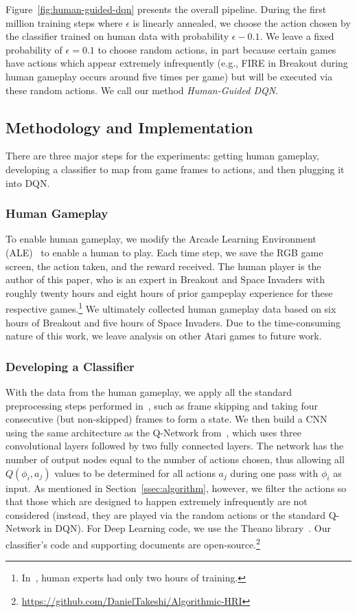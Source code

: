 \documentclass[letterpaper, 10pt, conference]{ieeeconf}
\begin{document}
Figure~\ref{fig:human-guided-dqn} presents the overall pipeline.  During the
first million training steps where $\epsilon$ is linearly annealed, we choose
the action chosen by the classifier trained on human data with probability
$\epsilon-0.1$. We leave a fixed probability of $\epsilon=0.1$ to choose random
actions, in part because certain games have actions which appear extremely
infrequently (e.g., FIRE in Breakout during human gameplay occurs around five
times per game) but will be executed via these random actions. We call our
method \emph{Human-Guided DQN}.

\subsection{Methodology and Implementation}\label{ssec:implementation}

There are three major steps for the experiments: getting human gameplay,
developing a classifier to map from game frames to actions, and then plugging it
into DQN. 

\subsubsection{Human Gameplay} To enable human gameplay, we modify the Arcade
Learning Environment (ALE)~\cite{bellemare13arcade} to enable a human to play.
Each time step, we save the RGB game screen, the action taken, and the reward
received. The human player is the author of this paper, who is an expert in
Breakout and Space Invaders with roughly twenty hours and eight hours of prior
gampeplay experience for these respective
games.\footnote{In~\cite{mnih-dqn-2015}, human experts had only two hours of
training.} We ultimately collected human gameplay data based on six hours of
Breakout and five hours of Space Invaders. Due to the time-consuming nature of
this work, we leave analysis on other Atari games to future work.

\subsubsection{Developing a Classifier} With the data from the human gameplay,
we apply all the standard preprocessing steps performed in~\cite{mnih-dqn-2015},
such as frame skipping and taking four consecutive (but non-skipped) frames to
form a state. We then build a CNN using the same architecture as the Q-Network
from~\cite{mnih-dqn-2015}, which uses three convolutional layers followed by two
fully connected layers. The network has the number of output nodes equal to the
number of actions chosen, thus allowing all $Q(\phi_i,a_j)$ values to be
determined for all actions $a_j$ during one pass with $\phi_i$ as input.  As
mentioned in Section~\ref{ssec:algorithm}, however, we filter the actions so
that those which are designed to happen extremely infrequently are not
considered (instead, they are played via the random actions or the standard
Q-Network in DQN). For Deep Learning code, we use the Theano
library~\cite{2016arXiv160502688short}.  Our classifier's code and supporting
documents are
open-source.\footnote{\url{https://github.com/DanielTakeshi/Algorithmic-HRI}}
\end{document}
